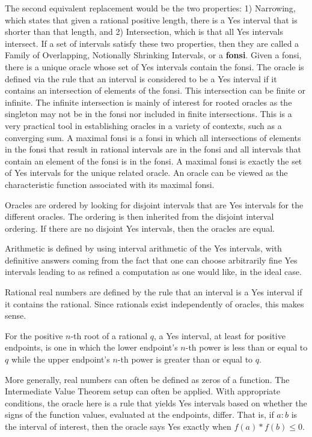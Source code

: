 \documentclass[12pt]{article}
\begin{document}
The second equivalent replacement would be the two properties: 1) Narrowing, which states that given a rational positive length, there is a Yes interval that is shorter than that length, and 2) Intersection, which is that all Yes intervals intersect. If a set of intervals satisfy these two properties, then they are called a Family of Overlapping, Notionally Shrinking Intervals, or a \textbf{fonsi}. Given a fonsi, there is a unique oracle whose set of Yes intervals contain the fonsi. The oracle is defined via the rule that an interval is considered to be a Yes interval if it contains an intersection of elements of the fonsi. This intersection can be finite or infinite. The infinite intersection is mainly of interest for rooted oracles as the singleton may not be in the fonsi nor included in finite intersections. This is a very practical tool in establishing oracles in a variety of contexts, such as a converging sum. A maximal fonsi is a fonsi in which all intersections of elements in the fonsi that result in rational intervals are in the fonsi and all intervals that contain an element of the fonsi is in the fonsi. A maximal fonsi is exactly the set of Yes intervals for the unique related oracle. An oracle can be viewed as the characteristic function associated with its maximal fonsi. 

Oracles are ordered by looking for disjoint intervals that are Yes intervals for the different oracles. The ordering is then inherited from the disjoint interval ordering. If there are no disjoint Yes intervals, then the oracles are equal. 

Arithmetic is defined by using interval arithmetic of the Yes intervals, with definitive answers coming from the fact that one can choose arbitrarily fine Yes intervals leading to as refined a computation as one would like, in the ideal case.  

Rational real numbers are defined by the rule that an interval is a Yes interval if it contains the rational. Since rationals exist independently of oracles, this makes sense. 

For the positive $n$-th root of a rational $q$, a Yes interval, at least for positive endpoints, is one in which the lower endpoint's $n$-th power is less than or equal to $q$ while the upper endpoint's $n$-th power is greater than or equal to $q$.

More generally, real numbers can often be defined as zeros of a function. The Intermediate Value Theorem setup can often be applied. With appropriate conditions, the oracle here is a rule that yields Yes intervals based on whether the signs of the function values, evaluated at the endpoints, differ. That is, if $a:b$ is the interval of interest, then the oracle says Yes exactly when $f(a)*f(b) \leq 0$.
\end{document}
